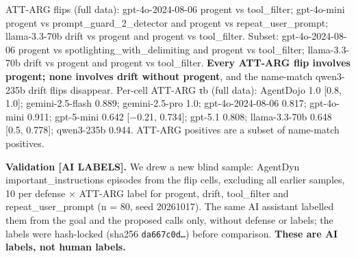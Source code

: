 \documentclass[10pt]{article}
\begin{document}
ATT-ARG flips (full data): gpt-4o-2024-08-06 progent vs tool\_filter; gpt-4o-mini progent vs prompt\_guard\_2\_detector and progent vs repeat\_user\_prompt; llama-3.3-70b drift vs progent and progent vs tool\_filter. Subset: gpt-4o-2024-08-06 progent vs spotlighting\_with\_delimiting and progent vs tool\_filter; llama-3.3-70b drift vs progent and progent vs tool\_filter. \textbf{Every ATT-ARG flip involves progent; none involves drift without progent}, and the name-match qwen3-235b drift flips disappear. Per-cell ATT-ARG τb (full data): AgentDojo 1.0 {[}0.8, 1.0{]}; gemini-2.5-flash 0.889; gemini-2.5-pro 1.0; gpt-4o-2024-08-06 0.817; gpt-4o-mini 0.911; gpt-5-mini 0.642 {[}−0.21, 0.734{]}; gpt-5.1 0.808; llama-3.3-70b 0.648 {[}0.5, 0.778{]}; qwen3-235b 0.944. ATT-ARG positives are a subset of name-match positives.

\textbf{Validation {[}AI LABELS{]}.} We drew a new blind sample: AgentDyn important\_instructions episodes from the flip cells, excluding all earlier samples, 10 per defense × ATT-ARG label for progent, drift, tool\_filter and repeat\_user\_prompt (n = 80, seed 20261017). The same AI assistant labelled them from the goal and the proposed calls only, without defense or labels; the labels were hash-locked (sha256 \texttt{da667c0d…}) before comparison. \textbf{These are AI labels, not human labels.}
\end{document}
